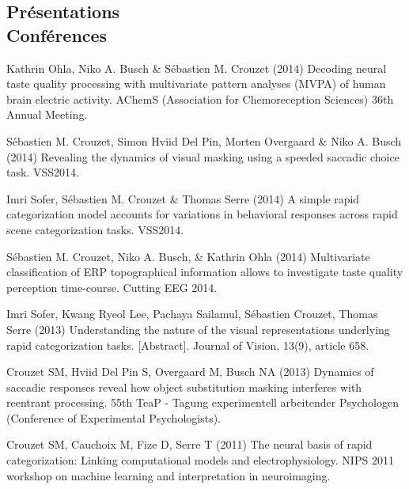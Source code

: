 \documentclass[margin,line]{resume}
\begin{document}
\begin{resume}
\vspace{3mm}	
    \section{\mysidestyle Présentations\\Conférences}

	\footnotesize %
	
	Kathrin Ohla, Niko A. Busch \& Sébastien M. Crouzet (2014) Decoding neural taste quality processing with multivariate pattern analyses (MVPA) of human brain electric activity. AChemS (Association for Chemoreception Sciences) 36th Annual Meeting.

	\vspace{-2mm} Sébastien M. Crouzet, Simon Hviid Del Pin, Morten Overgaard \& Niko A. Busch (2014) Revealing the dynamics of visual masking using a speeded saccadic choice task. VSS2014.

	\vspace{-2mm} Imri Sofer, Sébastien M. Crouzet \& Thomas Serre (2014) A simple rapid categorization model accounts for variations in behavioral responses across rapid scene categorization tasks. VSS2014.

	\vspace{-2mm} Sébastien M. Crouzet, Niko A. Busch, \& Kathrin Ohla (2014) Multivariate classification of ERP topographical information allows to investigate taste quality perception time-course. Cutting EEG 2014.
	
	\vspace{-2mm} Imri Sofer, Kwang Ryeol Lee, Pachaya Sailamul, Sébastien Crouzet, Thomas Serre (2013) Understanding the nature of the visual representations underlying rapid categorization tasks. [Abstract]. Journal of Vision, 13(9), article 658.

	\vspace{-2mm} Crouzet SM, Hviid Del Pin S, Overgaard M, Busch NA (2013) Dynamics of saccadic responses reveal how object substitution masking interferes with reentrant processing. 55th TeaP - Tagung experimentell arbeitender Psychologen (Conference of Experimental Psychologists).

	\vspace{-2mm} Crouzet SM, Cauchoix M, Fize D, Serre T (2011) The neural basis of rapid categorization: Linking computational models and electrophysiology. NIPS 2011 workshop on machine learning and interpretation in neuroimaging.


\end{resume}
\end{document}
